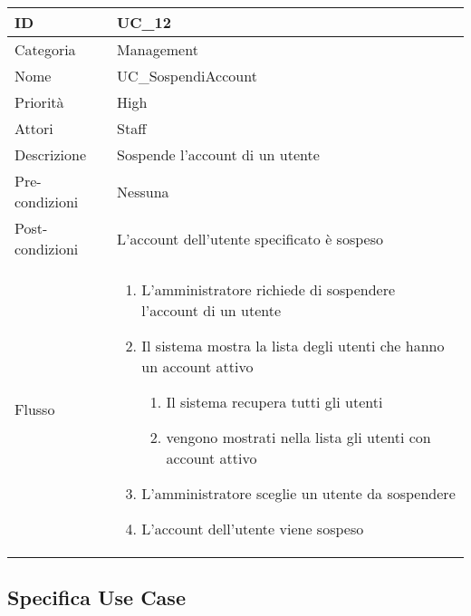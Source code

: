 \begin{center}
\begin{tabular}{ |p{2cm}|p{13.5cm}|  }
\hline
ID & UC\_12 \\\hline
Categoria & Management\\\hline
Nome & UC\_SospendiAccount\\\hline
Priorità & High \\\hline
Attori &  Staff \\\hline
Descrizione & Sospende l'account di un utente\\\hline
Pre-condizioni &  Nessuna\\\hline
Post-condizioni &  L'account dell'utente specificato è sospeso\\\hline
Flusso &  	
		\begin{enumerate}
		\item L'amministratore richiede di sospendere l'account di un utente
		\item Il sistema mostra la lista degli utenti che hanno un account attivo
			\begin{enumerate}[  ]
			\item Il sistema recupera tutti gli utenti
			\item vengono mostrati nella lista gli utenti con account attivo
			\end{enumerate}	
		\item L'amministratore sceglie un utente da sospendere
		\item L'account dell'utente viene sospeso
		\end{enumerate}\\\hline
\end{tabular}
\label{table_use_case:12}\newline










\subsection{Specifica Use Case}


\end{center}

